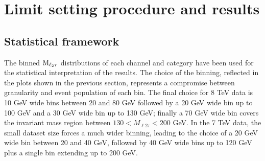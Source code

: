 \begin{table}
\caption{%
Expected event yields for the different background processes and for a 125 GeV WH, $\rm{H}\To\tau\tau$ signal compared to the number of events observed in the data, split by channel and category, for 7 TeV data. The uncertainty quoted on each background process represents statistical plus systematic uncertainty.}

\label{tab:prefit_yields_table_7TeV}
\end{table}


\section{Limit setting procedure and results}

\subsection{Statistical framework}
The binned $\rm{M}_{\ell_2 \tau}$ distributions of each channel and category have been used for the statistical interpretation of the results. The choice of the binning, reflected in the plots shown in the previous section, represents a compromise between granularity and event population of each bin. The final choice for 8 TeV data is 10 GeV wide bins between 20 and 80 GeV followed by a 20 GeV wide bin up to 100 GeV and a 30 GeV wide bin up to 130 GeV; finally a 70 GeV wide bin covers the invariant mass region between $130 < M_{\ell 2 \tau} < 200$ GeV. In the 7 TeV data, the small dataset size forces a much wider binning, leading to the choice of a 20 GeV wide bin between 20 and 40 GeV, followed by 40 GeV wide bins up to 120 GeV plus a single bin extending up to 200 GeV.



